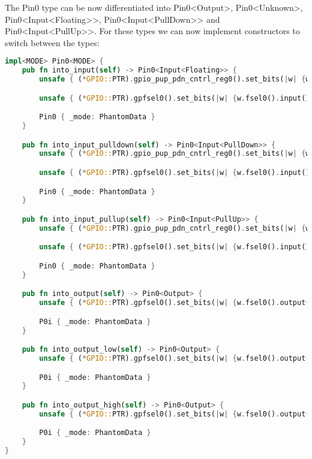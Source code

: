 The Pin0 type can be now differentiated into Pin0<Output>, Pin0<Unknown>, Pin0<Input<Floating>>, Pin0<Input<PullDown>> and Pin0<Input<PullUp>>.
For these types we can now implement constructors to switch between the types:

\begin{lstlisting}[language=Rust,style=colouredRust]
impl<MODE> Pin0<MODE> {
    pub fn into_input(self) -> Pin0<Input<Floating>> {
        unsafe { (*GPIO::PTR).gpio_pup_pdn_cntrl_reg0().set_bits(|w| {w.gpio_pup_pdn_cntrl0().none()})}

        unsafe { (*GPIO::PTR).gpfsel0().set_bits(|w| {w.fsel0().input()}) };

        Pin0 { _mode: PhantomData }
    }

    pub fn into_input_pulldown(self) -> Pin0<Input<PullDown>> {
        unsafe { (*GPIO::PTR).gpio_pup_pdn_cntrl_reg0().set_bits(|w| {w.gpio_pup_pdn_cntrl0().down()})}

        unsafe { (*GPIO::PTR).gpfsel0().set_bits(|w| {w.fsel0().input()}) };

        Pin0 { _mode: PhantomData }
    }

    pub fn into_input_pullup(self) -> Pin0<Input<PullUp>> {
        unsafe { (*GPIO::PTR).gpio_pup_pdn_cntrl_reg0().set_bits(|w| {w.gpio_pup_pdn_cntrl0().up()})}

        unsafe { (*GPIO::PTR).gpfsel0().set_bits(|w| {w.fsel0().input()}) };

        Pin0 { _mode: PhantomData }
    }

    pub fn into_output(self) -> Pin0<Output> {
        unsafe { (*GPIO::PTR).gpfsel0().set_bits(|w| {w.fsel0().output()})}

        P0i { _mode: PhantomData }
    }

    pub fn into_output_low(self) -> Pin0<Output> {
        unsafe { (*GPIO::PTR).gpfsel0().set_bits(|w| {w.fsel0().output()})}

        P0i { _mode: PhantomData }
    }

    pub fn into_output_high(self) -> Pin0<Output> {
        unsafe { (*GPIO::PTR).gpfsel0().set_bits(|w| {w.fsel0().output()})}

        P0i { _mode: PhantomData }
    }
}
\end{lstlisting}

